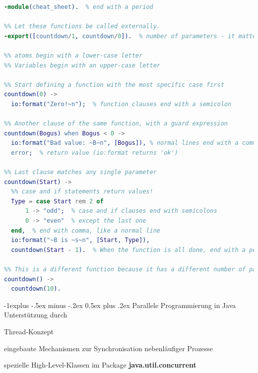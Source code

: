 \documentclass[10pt]{article}
\makeatletter
\renewcommand{\subsection}{\@startsection{subsection}{2}{0mm}%
                                {-1explus -.5ex minus -.2ex}%
                                {0.5ex plus .2ex}%
                                {\normalfont\normalsize\bfseries}}
\makeatother
\begin{document}
  \begin{lstlisting}[language=erlang]
%[Hello.erl]
-module(cheat_sheet).  % end with a period

%% Let these functions be called externally.
-export([countdown/1, countdown/0]).  % number of parameters - it matters!

%% atoms begin with a lower-case letter
%% Variables begin with an upper-case letter

%% Start defining a function with the most specific case first
countdown(0) ->  
  io:format("Zero!~n");  % function clauses end with a semicolon

%% Another clause of the same function, with a guard expression
countdown(Bogus) when Bogus < 0 ->
  io:format("Bad value: ~B~n", [Bogus]), % normal lines end with a comma
  error;  % return value (io:format returns 'ok')
  
%% Last clause matches any single parameter
countdown(Start) ->
  %% case and if statements return values!
  Type = case Start rem 2 of
      1 -> "odd";  % case and if clauses end with semicolons
      0 -> "even"  % except the last one
  end,  % end with comma, like a normal line
  io:format("~B is ~s~n", [Start, Type]), 
  countdown(Start - 1).  % When the function is all done, end with a period

%% This is a different function because it has a different number of parameters.
countdown() ->
  countdown(10).
\end{lstlisting}
  
  
  \subsection{Parallele Programmierung in Java}
  Unterstützung durch
  \begin{itemize*}
    \item Thread-Konzept
    \item eingebaute Mechanismen zur Synchronisation nebenläufiger Prozesse
    \item spezielle High-Level-Klassen im Package
    \newline \textbf{java.util.concurrent}
  \end{itemize*}
  
\end{document}
